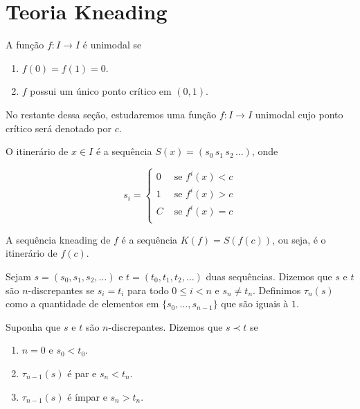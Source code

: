 \section{Teoria Kneading}

\begin{definition}
A função $f: I \to I$ é unimodal se
\begin{enumerate}
\item $f(0) = f(1) = 0$.
\item $f$ possui um único ponto crítico em $(0, 1)$.
\end{enumerate}
\end{definition}

No restante dessa seção, estudaremos uma função $f: I \to I$ unimodal cujo ponto crítico será denotado por $c$.

\begin{definition}
O itinerário de $x \in I$ é  a sequência $S(x) = (s_0 \, s_1 \, s_2 \, \dots)$, onde

\[ s_i = 
\begin{cases} 
  0 & \textrm{ se } f^i(x) < c \\
  1 & \textrm{ se } f^i(x) > c \\
  C & \textrm{ se } f^i(x) = c \\
\end{cases}
\]
\end{definition}

\begin{definition}
A sequência kneading de $f$ é a sequência $K(f) = S(f(c))$, ou seja, é o itinerário de $f(c)$.
\end{definition}

Sejam $s = (s_0, s_1, s_2, \dots)$ e $t = (t_0, t_1, t_2, \dots)$ duas sequências. Dizemos que $s$ e $t$ são $n$-discrepantes se $s_i = t_i$ para todo $0 \leq i < n$ e $s_n \neq t_n$. Definimos $\tau_n(s)$ como a quantidade de elementos em $\{ s_0, \dots, s_{n-1} \}$ que são iguais à $1$.

\begin{definition}
Suponha que $s$ e $t$ são $n$-discrepantes. Dizemos que $s \prec t$ se
\begin{enumerate}
\item $n = 0$ e $s_0 < t_0$.
\item $\tau_{n-1}(s)$ é par e $s_n < t_n$.
\item $\tau_{n-1}(s)$ é ímpar e $s_n > t_n$.
\end{enumerate}
\end{definition}

